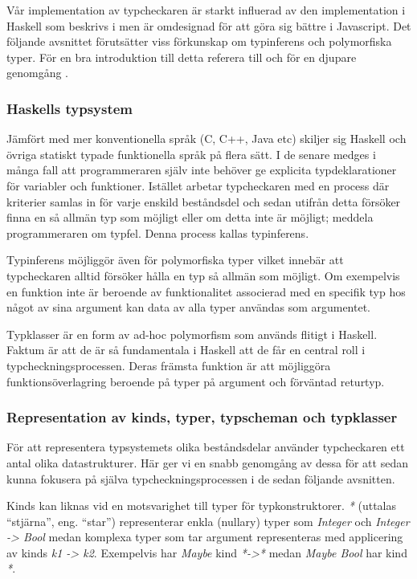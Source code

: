 Vår implementation av typcheckaren är starkt influerad av den implementation i Haskell som beskrivs i \citep{jones99} men är omdesignad för att göra sig bättre i Javascript. Det följande avsnittet förutsätter viss förkunskap om typinferens och polymorfiska typer. För en bra introduktion till detta referera till \citep{dragonbookchap6} och för en djupare genomgång \citep{pierce02}.

\subsubsection{Haskells typsystem}
Jämfört med mer konventionella språk (C, C++, Java etc) skiljer sig Haskell
och övriga statiskt typade funktionella språk på flera sätt. I de senare
medges i många fall att programmeraren själv inte behöver ge explicita
typdeklarationer för variabler och funktioner. Istället arbetar typcheckaren
med en process där kriterier samlas in för varje enskild beståndsdel och
sedan utifrån detta försöker finna en så allmän typ som möjligt eller om
detta inte är möjligt; meddela programmeraren om typfel. Denna process
kallas typinferens.

Typinferens möjliggör även för polymorfiska typer vilket innebär att
typcheckaren alltid försöker hålla en typ så allmän som möjligt. Om
exempelvis en funktion inte är beroende av funktionalitet associerad med en
specifik typ hos något av sina argument kan data av alla typer användas som
argumentet.

Typklasser är en form av ad-hoc polymorfism som används flitigt i
Haskell. Faktum är att de är så fundamentala i Haskell att de får en central
roll i typcheckningsprocessen. Deras främsta funktion är att möjliggöra funktionsöverlagring beroende på typer på argument och förväntad returtyp.

\subsubsection{Representation av kinds, typer, typscheman och typklasser}
För att representera typsystemets olika beståndsdelar använder typcheckaren ett antal olika datastrukturer. Här ger vi en snabb genomgång av dessa för att sedan kunna fokusera på själva typcheckningsprocessen i de sedan följande avsnitten. 

Kinds kan liknas vid en motsvarighet till typer för typkonstruktorer. \emph{*} (uttalas ``stjärna'', eng. ``star'') representerar enkla (nullary) typer som \emph{Integer} och \emph{Integer -> Bool} medan komplexa typer som tar argument representeras med applicering av kinds \emph{k1 -> k2}. Exempelvis har \emph{Maybe} kind \emph{*->*} medan \emph{Maybe Bool} har kind \emph{*}.

